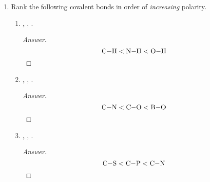 \documentclass[../psets.tex]{subfiles}
\begin{document}
\begin{enumerate}
\begin{enumerate}
\begin{enumerate}
\begin{proof}[Answer]
\begin{center}
                \end{center}
            \end{proof}
            \item {}.
            \begin{proof}[Answer]
                ${\color{white}hi}$
                \begin{center}
                \end{center}
            \end{proof}
            \item {}.
            \begin{proof}[Answer]
                ${\color{white}hi}$
                \begin{center}
                \end{center}
            \end{proof}
        \end{enumerate}
        \item Rank the following covalent bonds in order of \emph{increasing} polarity.
        \begin{enumerate}
            \item {}, , .
            \begin{proof}[Answer]
                \begin{equation*}
                    \ce{C-H} < \ce{N-H} < \ce{O-H}
                \end{equation*}
            \end{proof}
            \item {}, , .
            \begin{proof}[Answer]
                \begin{equation*}
                    \ce{C-N} < \ce{C-O} < \ce{B-O}
                \end{equation*}
            \end{proof}
            \item {}, , .
            \begin{proof}[Answer]
                \begin{equation*}
                    \ce{C-S} < \ce{C-P} < \ce{C-N}

\end{equation*}
\end{proof}
\end{enumerate}
\end{enumerate}
\end{enumerate}
\end{document}
